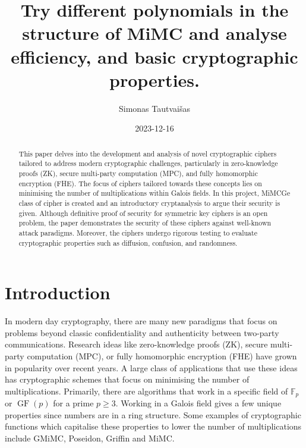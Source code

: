 \documentclass{Resources/UoBLab1}
\theoremstyle{definition}
\begin{document}

\title{Try different polynomials in the structure of MiMC and analyse efficiency, and basic cryptographic properties.}
\author{Simonas Tautvaišas}
\date{2023-12-16}

\maketitle



\begin{abstract}
    This paper delves into the development and analysis of novel cryptographic ciphers tailored to address modern cryptographic challenges, particularly in zero-knowledge proofs (ZK), secure multi-party computation (MPC), and fully homomorphic encryption (FHE). The focus of ciphers tailored towards these concepts lies on minimising the number of multiplications within Galois fields. In this project, MiMCGe class of cipher is created and an introductory cryptanalysis to argue their security is given. Although definitive proof of security for symmetric key ciphers is an open problem, the paper demonstrates the security of these ciphers against well-known attack paradigms. Moreover, the ciphers undergo rigorous testing to evaluate cryptographic properties such as diffusion, confusion, and randomness.
\end{abstract}

\section{Introduction}
In modern day cryptography, there are many new paradigms that focus on problems beyond classic confidentiality and authenticity between two-party communications. Research ideas like zero-knowledge proofs (ZK), secure multi-party computation (MPC), or fully homomorphic encryption (FHE) have grown in popularity over recent years. A large class of applications that use these ideas has cryptographic schemes that focus on minimising the number of multiplications. Primarily, there are algorithms that work in a specific field of $\mathbb{F}_p$ or $\operatorname{GF}(p)$ for a prime $p \geq 3$. Working in a Galois field gives a few unique properties since numbers are in a ring structure. Some examples of cryptographic functions which capitalise these properties to lower the number of multiplications include GMiMC\cite{GMiMC}, Poseidon\cite{Poseidon}, Griffin\cite{Griffin} and MiMC\cite{MiMC}.
\end{document}

